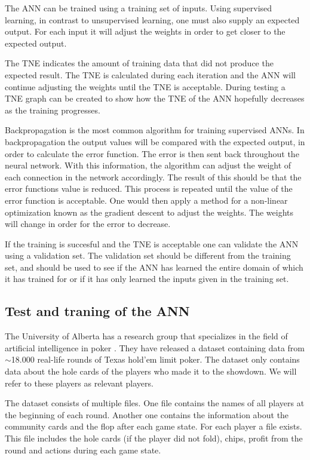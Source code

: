 
\vspace{4mm}


The ANN can be trained using a training set of inputs. Using supervised learning, in contrast to unsupervised learning, one must also supply an expected output. For each input it will adjust the weights in order to get closer to the expected output. 

The TNE indicates the amount of training data that did not produce the expected result. The TNE is calculated during each iteration and the ANN will continue adjusting the weights until the TNE is acceptable. During testing a TNE graph can be created to show how the TNE of the ANN hopefully decreases as the training progresses.  

Backpropagation is the most common algorithm for training supervised ANNs. In backpropagation the output values will be compared with the expected output, in order to calculate the error function. The error is then sent back throughout the neural network. With this information, the algorithm can adjust the weight of each connection in the network accordingly. The result of this should be that the error functions value  is reduced. This process is repeated until the value of the error function is acceptable. One would then apply a method for a non-linear optimization known as the gradient descent to adjust the weights. The weights will change in order for the error to decrease. 


If the training is succesful and the TNE is acceptable one can validate the ANN using a validation set. The validation set should be different from the training set, and should be used to see if the ANN has learned the entire domain of which it has trained for or if it has only learned the inputs given in the training set.

\subsection{Test and traning of the ANN}
\label{sec:default-test}
The University of Alberta has a research group that specializes in the field of artificial intelligence in poker \cite{alberta}. They have released a dataset containing data from $\sim$18.000 real-life rounds of Texas hold'em limit poker. The dataset only contains data about the hole cards of the players who made it to the showdown. We will refer to these players as relevant players.

The dataset consists of multiple files. One file contains the names of all players at the beginning of each round. Another one contains the information about the community cards and the flop after each game state. For each player a file exists. This file includes the hole cards (if the player did not fold), chips, profit from the round and actions during each game state. 

